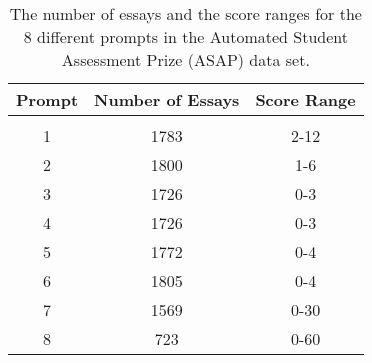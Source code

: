 \documentclass[11pt,a4paper]{article}
\begin{document}
\begin{table}[!t]
\setlength\tabcolsep{5.5pt}
\begin{center}
\begin{tabular}{ccc}
\hline
Prompt 				& Number of Essays		&	Score Range	\\
\hline
\hline
\vspace{-0.9em}\\
1							& 1783						& 2-12\\
2							& 1800 						& 1-6\\											
3							& 1726						& 0-3\\													
4							& 1726						& 0-3\\																							
5							& 1772						& 0-4\\
6							& 1805						& 0-4\\
7							& 1569						& 0-30\\
8							& 723						& 0-60\\
\hline
\end{tabular}
\end{center}
\vspace*{-0.2cm}
\caption{The number of essays and the score ranges for the 8 different prompts in the Automated Student Assessment Prize (ASAP) data set.}
\label{tab_asap}
\vspace*{-0.3cm}
\end{table}
\end{document}
